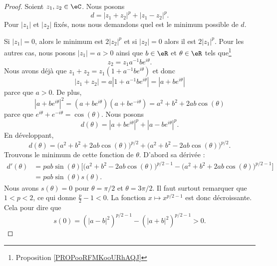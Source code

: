 \begin{proof}
	Soient \( z_1,z_2\in \eC\). Nous posons
	\begin{equation}        \label{EQooJKYZooFzbETG}
		d=| z_1+z_2 |^p+| z_1-z_2 |^p.
	\end{equation}
	Pour \( | z_1 |\) et \( | z_2 |\) fixés, nous nous demandons quel est le minimum possible de \( d\).

	Si \( | z_1 |=0\), alors le minimum est \( 2| z_2 |^p\) et si \( | z_2 |=0\) alors il est \( 2| z_1 |^p\). Pour les autres cas, nous posons \( | z_1 |=a>0\) ainsi que \( b\in \eR\) et \( \theta\in \eR\) tels que\footnote{Proposition \ref{PROPooRFMKooURhAQJ}}
	\begin{equation}
		z_2=z_1a^{-1}b e^{i\theta}.
	\end{equation}
	Nous avons déjà que \( z_1+z_2=z_1(1+a^{-1}b e^{i\theta})\) et donc
	\begin{equation}
		| z_1+z_2 |=a| 1+a^{-1}b e^{i\theta} |=| a+b e^{i\theta} |
	\end{equation}
	parce que \( a>0\). De plus,
	\begin{equation}
		| a+b e^{i\theta} |^2= (a+b e^{i\theta})(a+b e^{-i\theta})=a^2+b^2+2ab\cos(\theta)
	\end{equation}
	parce que \(  e^{i\theta}+ e^{-i\theta}=\cos(\theta)\). Nous posons
	\begin{equation}
		d(\theta)=| a+b e^{i\theta} |^p+| a-b e^{i\theta} |^p.
	\end{equation}
	En développant,
	\begin{equation}
		d(\theta)=\big(a^2+b^2+2ab\cos(\theta)\big)^{p/2}+\big(a^2+b^2-2ab\cos(\theta)\big)^{p/2}.
	\end{equation}
	Trouvons le minimum de cette fonction de \( \theta\). D'abord sa dérivée :
	\begin{subequations}
		\begin{align}
			d'(\theta) & =pab\sin(\theta)\big[ \big( a^2+b^2-2ab\cos(\theta) \big)^{p/2-1}-\big( a^2+b^2+2ab\cos(\theta) \big)^{p/2-1}  \big] \\
			           & =pab\sin(\theta)s(\theta).
		\end{align}
	\end{subequations}
	Nous avons \( s(\theta)=0\) pour \( \theta=\pi/2\) et \( \theta=3\pi/2\). Il faut surtout remarquer que \( 1<p<2\), ce qui donne \( \frac{ p }{2}-1<0\). La fonction \( x\mapsto x^{p/2-1}\) est donc décroissante. Cela pour dire que
	\begin{equation}
		s(0)=\left( | a-b |^2 \right)^{p/2-1}-\left( | a+b |^2 \right)^{p/2-1}>0.

\end{equation}
\end{proof}
